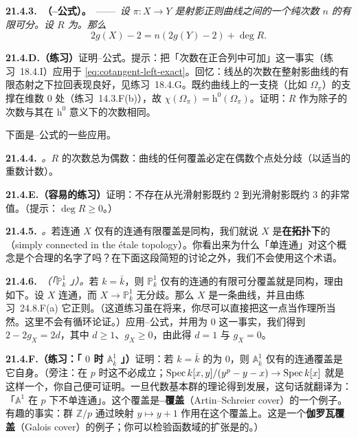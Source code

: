 \textbf{21.4.3.\ \trhTheorem（\trRiemann--\trHurwitz{}公式）。}\ ——\ \emph{设 $\pi\colon X\to Y$ 是射影正则曲线之间的一个纯次数 $n$ 的有限可分\trMorphism。设 $R$ 为\trRamificationDivisor。那么}
\begin{equation*}\tag{21.4.3.1}\label{eq:riemann-hurwitz}
2g(X)-2=n(2g(Y)-2)+\deg R.
\end{equation*}

\textbf{21.4.D.（练习）}\quad 证明\trRiemann--\trHurwitz{}公式。提示：把「次数在正合列中可加」这一事实（\mbox{练习~18.4.I}）应用于 \eqref{eq:cotangent-left-exact}。回忆：线丛的次数在整射影曲线的有限态射之下拉回表现良好，见\mbox{练习~18.4.G}。既约曲线上的一支挠\trCoherentSheaf（比如 $\Omega_\pi$）的支撑在维数 $0$ 处（\mbox{练习~14.3.F(b)}），故 $\chi(\Omega_\pi)=\mathrm{h}^0(\Omega_\pi)$。证明：$R$ 作为除子的次数与其在 $\mathrm{h}^0$ 意义下的次数相同。

下面是\trRiemann--\trHurwitz{}公式的一些应用。

\textbf{21.4.4.}\ \emph{\trhExample{}。}\quad $R$ 的次数总为偶数：曲线的任何覆盖必定在偶数个点处分歧（以适当的重数计数）。

\textbf{21.4.E.（容易的练习）}\quad 证明：不存在从光滑射影既约\trGenus{} $2$ \trCurve{}到光滑射影既约\trGenus{} $3$ \trCurve{}的非常值\trMap{}。（提示：$\deg R\ge 0$。）

\textbf{21.4.5.}\ \emph{\trhDefinition{}。}\quad 若连通\trScheme{} $X$ 仅有的连通有限\trEtale{}覆盖是同构，我们就说 $X$ 是\textbf{在\trEtale{}拓扑下\trSimplyConnected}的（simply connected in the étale topology）。你看出来为什么「单连通」对这个概念是个合理的名字了吗？在下面这段简短的讨论之外，我们不会使用这个术语。

\textbf{21.4.6.}\ \emph{\trhExample{}（「$\mathbb{P}^1_k$ \trSimplyConnected」）。}\quad 若 $k=\bar{k}$，则 $\mathbb{P}^1_k$ 仅有的连通\trUnbranched{}的有限可分覆盖就是同构，理由如下。设 $X$ 连通，而 $X\to\mathbb{P}^1_k$ 无分歧。那么 $X$ 是一条曲线，并且由\mbox{练习~24.8.F(a)} 它正则。（这道练习虽在将来，你尽可以直接把这一点当作理所当然。这里不会有循环论证。）应用\trRiemann--\trHurwitz{}公式，并用\trRamificationDivisor{}为 $0$ 这一事实，我们得到 $2-2g_X=2d$，其中 $d\ge 1$、$g_X\ge 0$，由此得 $d=1$ 与 $g_X=0$。

\textbf{21.4.F.（练习：「\trCharacteristic{} $0$ 时 $\mathbb{A}^1_{\bar{k}}$ \trSimplyConnected」）}\quad 证明：若 $k=\bar{k}$ 的\trCharacteristic{}为 $0$，则 $\mathbb{A}^1_{\bar{k}}$ 仅有的连通\trUnbranched{}覆盖是它自身。（旁注：在\trCharacteristic{} $p$ 时这不必成立；$\operatorname{Spec} k[x,y]/(y^p-y-x)\to\operatorname{Spec} k[x]$ 就是这样一个\trMap，你自己便可证明。一旦代数基本群的理论得到发展，这句话就翻译为：「$\mathbb{A}^1$ 在\trCharacteristic{} $p$ 下不单连通」。这个覆盖是\textbf{\trArtin--\trSchreier{}覆盖}（Artin--Schreier cover）的一个例子。有趣的事实：群 $\mathbb{Z}/p$ 通过映射 $y\mapsto y+1$ 作用在这个覆盖上。这是一个\textbf{伽罗瓦覆盖}（Galois cover）的例子；你可以检验函数域的扩张是\trGalois{}的。）

